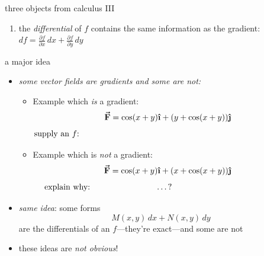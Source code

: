 \documentclass{beamer}
\newcommand{\ih}{\boldsymbol{\hat{\textbf{\i}}}}
\newcommand{\jh}{\boldsymbol{\hat{\textbf{\j}}}}
\newcommand{\vF}{\boldsymbol{\vec{\textbf{F}}}}
\begin{document}
\begin{frame}{three objects from calculus III}
\begin{enumerate}
    \vspace{-2mm}
    \begin{itemize}
    \item the gradient is a vector field
    \item the gradient points uphill on the surface $z=f(x,y)$
    \end{itemize}
\item the \emph{differential} of $f$ contains the same information as the gradient: $df = \frac{\partial f}{\partial x}\,dx + \frac{\partial f}{\partial y}\,dy$
\end{enumerate}
\end{frame}


\begin{frame}{a major idea}

\begin{itemize}
\item \emph{some vector fields are gradients and some are not:}

\medskip
    \begin{itemize}
    \item Example which \emph{is} a gradient:
        $$\vF=\cos(x+y)\ih + (y+\cos(x+y))\jh$$
        $$\text{supply an $f$:} \hspace{4.0in}$$

\medskip
    \item Example which is \emph{not} a gradient:
        $$\vF=\cos(x+y)\ih + (x+\cos(x+y))\jh$$
        $$\text{explain why: \hspace{1.0in} \dots ?} \hspace{2.0in}$$
    \end{itemize}
\item \emph{same idea}: some forms
    $$M(x,y)\,dx + N(x,y)\,dy$$
are the differentials of an $f$---they're \alert{exact}---and some are not
\item these ideas are \emph{not obvious}!
\end{itemize}
\end{frame}
\end{document}
